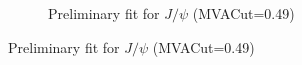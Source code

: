 \begin{figure}
\begin{subfigure}{0.49\textwidth}
        \caption*{Preliminary fit for $J/\psi$ (MVACut=0.49)}
        \label{fig:prefit_mvascan_mvacut040_b}
    \end{subfigure}
\end{figure}
